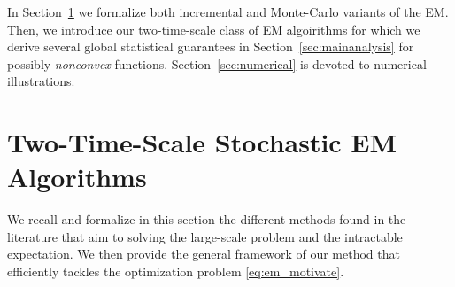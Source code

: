 \documentclass[11pt]{article}
\theoremstyle{t}
\begin{document}
In Section~\ref{sec:tts} we formalize both incremental and Monte-Carlo variants of the EM. Then, we introduce our two-time-scale class of EM algoirithms for which we derive several global statistical guarantees in Section~\ref{sec:mainanalysis} for possibly \textit{nonconvex} functions.
Section~\ref{sec:numerical} is devoted to numerical illustrations.\vspace{-.1cm}

\section{Two-Time-Scale Stochastic EM Algorithms}\label{sec:tts}
We recall and formalize in this section the different methods found in the literature that aim to solving the large-scale problem and the intractable expectation. 
We then provide the general framework of our method that efficiently tackles the optimization problem \eqref{eq:em_motivate}.
\end{document}
